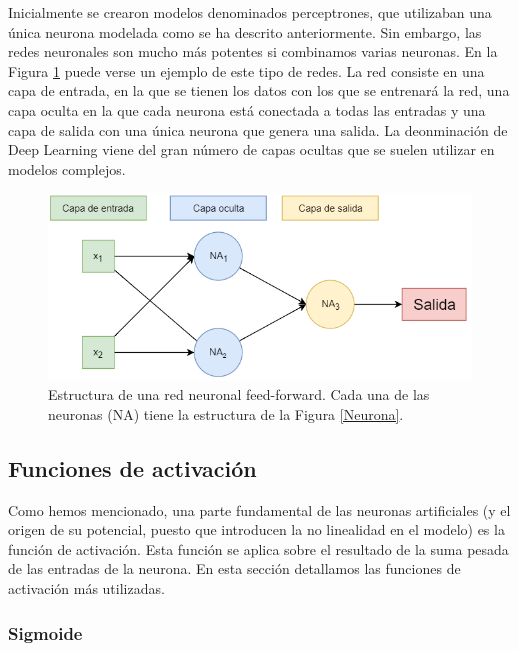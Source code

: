 \documentclass[spanish,a4paper, 11pt]{article}
\numberwithin{equation}{section}
\numberwithin{table}{section}
\numberwithin{figure}{section}
\begin{document}
Inicialmente se crearon modelos denominados perceptrones, que utilizaban una única neurona modelada como se ha descrito anteriormente. Sin embargo, las redes neuronales son mucho más potentes si combinamos varias neuronas. En la Figura \ref{FNN} puede verse un ejemplo de este tipo de redes. La red consiste en una capa de entrada, en la que se tienen los datos con los que se entrenará la red, una capa oculta en la que cada neurona está conectada a todas las entradas y una capa de salida con una única neurona que genera una salida. La deonminación de Deep Learning viene del gran número de capas ocultas que se suelen utilizar en modelos complejos.

\begin{figure}[H]
	\centering
	\includegraphics[width=0.7\linewidth]{FNN.png}
	\caption{Estructura de una red neuronal feed-forward. Cada una de las neuronas (NA) tiene la estructura de la Figura \ref{Neurona}.}
	\label{FNN}	
\end{figure}

\subsection{Funciones de activación}

Como hemos mencionado, una parte fundamental de las neuronas artificiales (y el origen de su potencial, puesto que introducen la no linealidad en el modelo) es la función de activación. Esta función se aplica sobre el resultado de la suma pesada de las entradas de la neurona. En esta sección detallamos las funciones de activación más utilizadas.

\subsubsection{Sigmoide}
\end{document}
